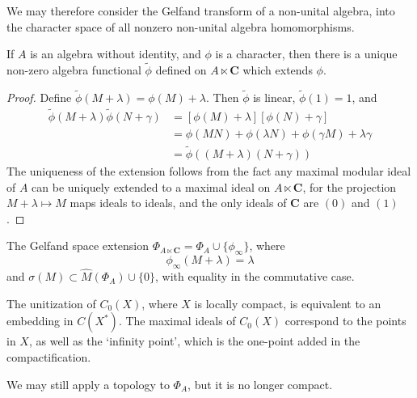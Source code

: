 We may therefore consider the Gelfand transform of a non-unital algebra, into the character space of all nonzero non-unital algebra homomorphisms.

\begin{lemma}
    If $A$ is an algebra without identity, and $\phi$ is a character, then there is a unique non-zero algebra functional $\tilde{\phi}$ defined on $A \ltimes \mathbf{C}$ which extends $\phi$.
\end{lemma}
\begin{proof}
    Define $\tilde{\phi}(M + \lambda) = \phi(M) + \lambda$. Then $\tilde{\phi}$ is linear, $\tilde{\phi}(1) = 1$, and
    \begin{align*}
        \tilde{\phi}(M + \lambda) \tilde{\phi}(N + \gamma) &= [\phi(M) + \lambda][\phi(N) + \gamma]\\
        &= \phi(MN) + \phi(\lambda N) + \phi(\gamma M) + \lambda \gamma\\
        &= \tilde{\phi}((M + \lambda)(N + \gamma))
    \end{align*}
    The uniqueness of the extension follows from the fact any maximal modular ideal of $A$ can be uniquely extended to a maximal ideal on $A \ltimes \mathbf{C}$, for the projection $M + \lambda \mapsto M$ maps ideals to ideals, and the only ideals of $\mathbf{C}$ are $(0)$ and $(1)$.
\end{proof}

\begin{corollary}
    The Gelfand space extension $\Phi_{A \ltimes \mathbf{C}} = \Phi_A \cup \{ \phi_\infty \}$, where
    \[ \phi_\infty(M + \lambda) = \lambda \]
    and $\sigma(M) \subset \widehat{M}(\Phi_A) \cup \{ 0 \}$, with equality in the commutative case.
\end{corollary}

\begin{example}
    The unitization of $C_0(X)$, where $X$ is locally compact, is equivalent to an embedding in $C(X^*)$. The maximal ideals of $C_0(X)$ correspond to the points in $X$, as well as the `infinity point', which is the one-point added in the compactification.
\end{example}

We may still apply a topology to $\Phi_A$, but it is no longer compact.

